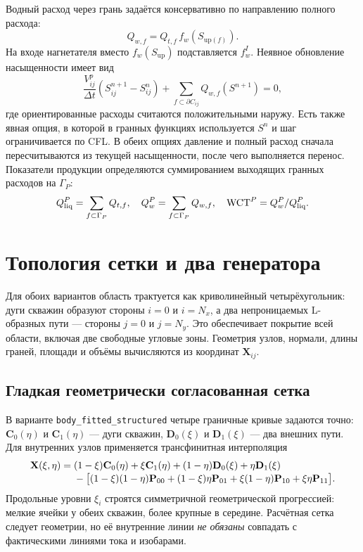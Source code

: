\documentclass[12pt,a4paper]{article}
\begin{document}
Водный расход через грань задаётся консервативно по направлению полного
расхода:
\begin{equation}
 Q_{w,f}=Q_{t,f}\,f_w(S_{\mathrm{up}(f)}).
 \label{eq:upwind}
\end{equation}
На входе нагнетателя вместо $f_w(S_{\mathrm{up}})$ подставляется $f_w^I$.
Неявное обновление насыщенности имеет вид
\begin{equation}
 \frac{V^p_{ij}}{\Delta t}(S_{ij}^{n+1}-S_{ij}^{n})
 +\sum_{f\subset\partial C_{ij}}Q_{w,f}(S^{n+1})=0,
 \label{eq:implicit}
\end{equation}
где ориентированные расходы считаются положительными наружу. Есть также
явная опция, в которой в гранных функциях используется $S^n$ и шаг
ограничивается по CFL. В обеих опциях давление и полный расход сначала
пересчитываются из текущей насыщенности, после чего выполняется перенос.
Показатели продукции определяются суммированием выходящих гранных расходов
на $\Gamma_P$:
\begin{equation}
 Q_{\rm liq}^{P}=\sum_{f\subset\Gamma_P}Q_{t,f},\quad
 Q_w^{P}=\sum_{f\subset\Gamma_P}Q_{w,f},\quad
 \mathrm{WCT}^{P}=Q_w^P/Q_{\rm liq}^P.
\end{equation}

\section{Топология сетки и два генератора}

Для обоих вариантов область трактуется как криволинейный четырёхугольник:
дуги скважин образуют стороны $i=0$ и $i=N_x$, а два непроницаемых
L-образных пути --- стороны $j=0$ и $j=N_y$. Это обеспечивает покрытие
всей области, включая две свободные угловые зоны. Геометрия узлов, нормали,
длины граней, площади и объёмы вычисляются из координат $\mathbf X_{ij}$.

\subsection{Гладкая геометрически согласованная сетка}

В варианте \texttt{body\_fitted\_structured} четыре граничные кривые
задаются точно: $\mathbf C_0(\eta)$ и $\mathbf C_1(\eta)$ --- дуги
скважин, $\mathbf D_0(\xi)$ и $\mathbf D_1(\xi)$ --- два внешних пути.
Для внутренних узлов применяется трансфинитная интерполяция
\begin{align}
 \mathbf X(\xi,\eta)={}&(1-\xi)\mathbf C_0(\eta)
 +\xi\mathbf C_1(\eta)
 +(1-\eta)\mathbf D_0(\xi)+\eta\mathbf D_1(\xi)
 \notag\\[-1mm]
 &-\bigl[(1-\xi)(1-\eta)\mathbf P_{00}
 +(1-\xi)\eta\mathbf P_{01}
 +\xi(1-\eta)\mathbf P_{10}+\xi\eta\mathbf P_{11}\bigr].
 \label{eq:tfi}
\end{align}
Продольные уровни $\xi_i$ строятся симметричной геометрической прогрессией:
мелкие ячейки у обеих скважин, более крупные в середине. Расчётная сетка
следует геометрии, но её внутренние линии \emph{не обязаны} совпадать с
фактическими линиями тока и изобарами.
\end{document}
